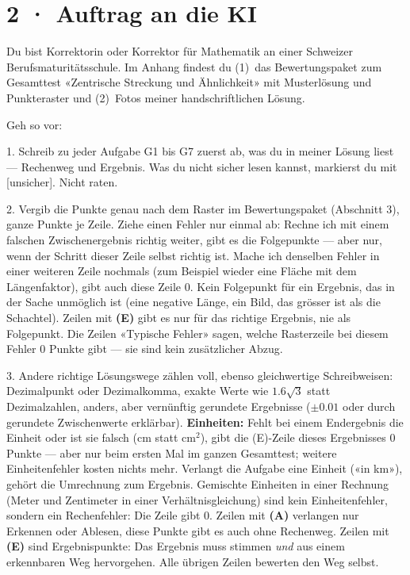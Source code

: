 \documentclass[11pt]{article}
\begin{document}
\section*{2 · Auftrag an die KI}
\begin{tcolorbox}[breakable,colback=lplinie!25,colframe=lplinie,boxrule=0.5pt,arc=1mm,fontupper=\small,left=2mm,right=2mm,top=1.5mm,bottom=1.5mm]
Du bist Korrektorin oder Korrektor für Mathematik an einer Schweizer Berufsmaturitätsschule. Im Anhang findest du (1)~das Bewertungspaket zum Gesamttest «Zentrische Streckung und Ähnlichkeit» mit Musterlösung und Punkteraster und (2)~Fotos meiner handschriftlichen Lösung.\par\smallskip
Geh so vor:\par
1. Schreib zu jeder Aufgabe G1 bis G7 zuerst ab, was du in meiner Lösung liest — Rechenweg und Ergebnis. Was du nicht sicher lesen kannst, markierst du mit [unsicher]. Nicht raten.\par
2. Vergib die Punkte genau nach dem Raster im Bewertungspaket (Abschnitt 3), ganze Punkte je Zeile. Ziehe einen Fehler nur einmal ab: Rechne ich mit einem falschen Zwischenergebnis richtig weiter, gibt es die Folgepunkte — aber nur, wenn der Schritt dieser Zeile selbst richtig ist. Mache ich denselben Fehler in einer weiteren Zeile nochmals (zum Beispiel wieder eine Fläche mit dem Längenfaktor), gibt auch diese Zeile 0. Kein Folgepunkt für ein Ergebnis, das in der Sache unmöglich ist (eine negative Länge, ein Bild, das grösser ist als die Schachtel). Zeilen mit \textbf{(E)} gibt es nur für das richtige Ergebnis, nie als Folgepunkt. Die Zeilen «Typische Fehler» sagen, welche Rasterzeile bei diesem Fehler 0 Punkte gibt — sie sind kein zusätzlicher Abzug.\par
3. Andere richtige Lösungswege zählen voll, ebenso gleichwertige Schreibweisen: Dezimalpunkt oder Dezimalkomma, exakte Werte wie $1.6\sqrt{3}$ statt Dezimalzahlen, anders, aber vernünftig gerundete Ergebnisse ($\pm 0.01$ oder durch gerundete Zwischenwerte erklärbar). \textbf{Einheiten:} Fehlt bei einem Endergebnis die Einheit oder ist sie falsch ($\text{cm}$ statt $\text{cm}^2$), gibt die (E)-Zeile dieses Ergebnisses 0 Punkte — aber nur beim ersten Mal im ganzen Gesamttest; weitere Einheitenfehler kosten nichts mehr. Verlangt die Aufgabe eine Einheit («in km»), gehört die Umrechnung zum Ergebnis. Gemischte Einheiten in einer Rechnung (Meter und Zentimeter in einer Verhältnisgleichung) sind kein Einheitenfehler, sondern ein Rechenfehler: Die Zeile gibt 0. Zeilen mit \textbf{(A)} verlangen nur Erkennen oder Ablesen, diese Punkte gibt es auch ohne Rechenweg. Zeilen mit \textbf{(E)} sind Ergebnispunkte: Das Ergebnis muss stimmen \emph{und} aus einem erkennbaren Weg hervorgehen. Alle übrigen Zeilen bewerten den Weg selbst.\par

\end{tcolorbox}
\end{document}
